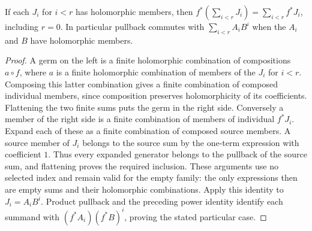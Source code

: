 \begin{lemma}
\label{hir:actual-holomorphic-finite-sum-pullback}
\leanok
If each $J_i$ for $i<r$ has holomorphic members, then
$f^*(\sum_{i<r}J_i)=\sum_{i<r}f^*J_i$, including $r=0$. In particular pullback commutes with $\sum_{i<r} A_i B^i$ when the $A_i$ and $B$ have holomorphic members.
\end{lemma}
\begin{proof}
A germ on the left is a finite holomorphic combination of compositions
$a\circ f$, where $a$ is a finite holomorphic combination of members of
the $J_i$ for $i<r$. Composing this latter combination gives a finite
combination of composed individual members, since composition preserves
holomorphicity of its coefficients. Flattening the two finite sums puts
the germ in the right side. Conversely a member of the right side is a
finite combination of members of individual $f^*J_i$. Expand each of
these as a finite combination of composed source members. A source
member of $J_i$ belongs to the source sum by the one-term expression
with coefficient $1$. Thus every expanded generator belongs to the
pullback of the source sum, and flattening proves the required
inclusion. These arguments use no selected index and remain valid for
the empty family: the only expressions then are empty sums and their
holomorphic combinations. Apply this identity to $J_i=A_iB^i$. Product pullback and the preceding power identity identify each summand with $(f^*A_i)(f^*B)^i$, proving the stated particular case.
\end{proof}

